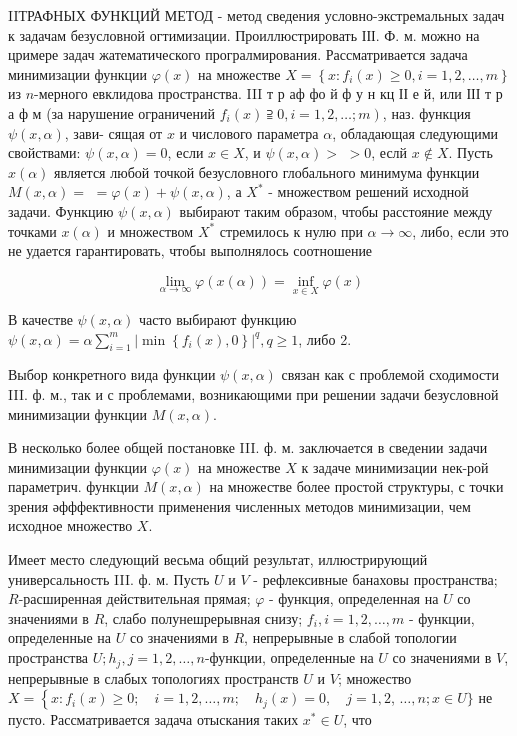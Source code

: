 \documentclass[10pt]{article}
\begin{document}
IIТРАФНЫХ ФУНКЦИЙ МЕТОД - метод сведения условно-экстремальных задач к задачам безусловной огтимизации. Проиллюстрировать ІІІ. Ф. м. можно на цримере задач жатематического програлмирования. Рассматривается задача минимизации функции $\varphi(x)$ на множестве $X=\left\{x: f_{i}(x) \geqslant 0, i=1,2, \ldots, m\right\}$ из $n$-мерного евклидова пространства. III т р аф фо й ф у н кц ІІ е й, или ІІІ т р а ф м (за нарушение ограничений $\left.f_{i}(x) \supseteqq 0, i=1,2, \ldots ; m\right)$, наз. функция $\psi(x, \alpha)$, зави- сящая от $x$ и числового параметра $\alpha$, обладающая следующими свойствами: $\psi(x, \alpha)=0$, если $x \in X$, и $\psi(x, \alpha)>$ $>0$, еслй $x \notin X$. Пусть $x(\alpha)$ является любой точкой безусловного глобального минимума функции $M(x, \alpha)=$ $=\varphi(x)+\psi(x, \alpha)$, а $X^{*}$ - множеством решений исходной задачи. Функцию $\psi(x, \alpha)$ выбирают таким образом, чтобы расстояние между точками $x(\alpha)$ и множеством $X^{*}$ стремилось к нулю при $\alpha \longrightarrow \infty$, либо, если это не удается гарантировать, чтобы выполнялось соотношение



\[

\lim _{\alpha \rightarrow \infty} \varphi(x(\alpha))=\inf _{x \in X} \varphi(x)

\]



В качестве $\psi(x, \alpha)$ часто выбирают функцию $\psi(x, \alpha)=\alpha \sum_{i=1}^{m}\left|\min \left\{f_{i}(x), 0\right\}\right|^{q}, q \geqslant 1$, либо 2.



Выбор конкретного вида функции $\psi(x, \alpha)$ связан как с проблемой сходимости III. ф. м., так и с проблемами, возникающими при решении задачи безусловной минимизации функции $M(x, \alpha)$.



В несколько более общей постановке III. ф. м. заключается в сведении задачи минимизации функции $\varphi(x)$ на множестве $X$ к задаче минимизации нек-рой параметрич. функции $M(x, \alpha)$ на множестве более простой структуры, с точки зрения әфффективности применения численных методов минимизации, чем исходное множество $X$.



Имеет место следующий весьма общий результат, иллюстрирующий универсальность III. ф. м. Пусть $U$ и $V$ - рефлексивные банаховы пространства; $R$-расширенная действительная прямая; $\varphi$ - функция, определенная на $U$ со значениями в $R$, слабо полунешрерывная снизу; $f_{i}, i=1,2, \ldots, m$ - функции, определенные на $U$ со значениями в $R$, непрерывные в слабой топологии пространства $U ; h_{j}, j=1,2, \ldots, n$-функции, определенные на $U$ со значениями в $V$, непрерывные в слабых топологиях пространств $U$ и $V$; множество $X=\left\{x: f_{i}(x) \geqslant 0 ; \quad i=1,2, \ldots, m ; \quad h_{j}(x)=0, \quad j=1,2\right.$, $\ldots, n ; x \in U\}$ не пусто. Рассматривается задача отыскания таких $x^{*} \in U$, что
\end{document}
